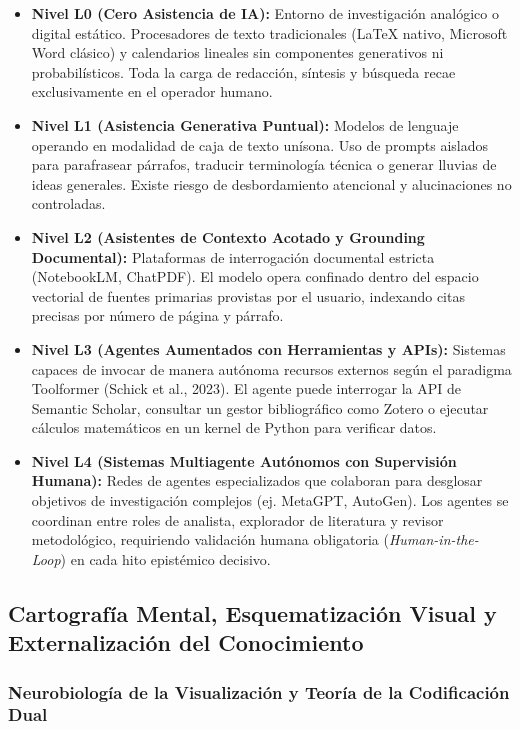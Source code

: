 \begin{itemize}
    \item \textbf{Nivel L0 (Cero Asistencia de IA):} Entorno de investigación analógico o digital estático. Procesadores de texto tradicionales (LaTeX nativo, Microsoft Word clásico) y calendarios lineales sin componentes generativos ni probabilísticos. Toda la carga de redacción, síntesis y búsqueda recae exclusivamente en el operador humano.
    \item \textbf{Nivel L1 (Asistencia Generativa Puntual):} Modelos de lenguaje operando en modalidad de caja de texto unísona. Uso de prompts aislados para parafrasear párrafos, traducir terminología técnica o generar lluvias de ideas generales. Existe riesgo de desbordamiento atencional y alucinaciones no controladas.
    \item \textbf{Nivel L2 (Asistentes de Contexto Acotado y Grounding Documental):} Plataformas de interrogación documental estricta (NotebookLM, ChatPDF). El modelo opera confinado dentro del espacio vectorial de fuentes primarias provistas por el usuario, indexando citas precisas por número de página y párrafo.
    \item \textbf{Nivel L3 (Agentes Aumentados con Herramientas y APIs):} Sistemas capaces de invocar de manera autónoma recursos externos según el paradigma Toolformer (Schick et al., 2023). El agente puede interrogar la API de Semantic Scholar, consultar un gestor bibliográfico como Zotero o ejecutar cálculos matemáticos en un kernel de Python para verificar datos.
    \item \textbf{Nivel L4 (Sistemas Multiagente Autónomos con Supervisión Humana):} Redes de agentes especializados que colaboran para desglosar objetivos de investigación complejos (ej. MetaGPT, AutoGen). Los agentes se coordinan entre roles de analista, explorador de literatura y revisor metodológico, requiriendo validación humana obligatoria (\textit{Human-in-the-Loop}) en cada hito epistémico decisivo.
\end{itemize}

\subsection{Cartografía Mental, Esquematización Visual y Externalización del Conocimiento}

\subsubsection{Neurobiología de la Visualización y Teoría de la Codificación Dual}

